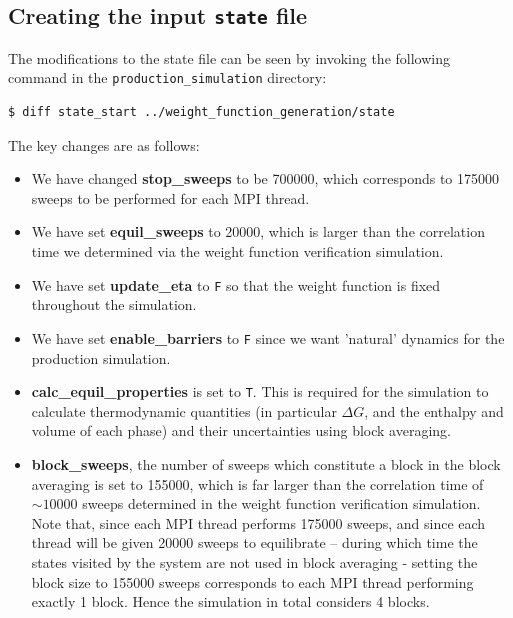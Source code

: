 \documentclass{report}
\begin{document}
\subsection{Creating the input \texttt{state} file}
The modifications to the state file can be seen by invoking the following command in the \texttt{production\_simulation} directory:
\begin{verbatim}
$ diff state_start ../weight_function_generation/state
\end{verbatim}
The key changes are as follows:
\begin{itemize}
\item We have changed \textbf{stop\_sweeps} to be 700000, which corresponds to 175000 sweeps to be performed for each MPI thread.
\item We have set \textbf{equil\_sweeps} to 20000, which is larger than the correlation time we determined via the weight function verification
simulation.
\item We have set \textbf{update\_eta} to \texttt{F} so that the weight function is fixed throughout the simulation.
\item We have set \textbf{enable\_barriers} to \texttt{F} since we want 'natural' dynamics for the production simulation.
\item \textbf{calc\_equil\_properties} is set to \texttt{T}. This is required for the simulation to calculate thermodynamic quantities (in particular
$\Delta G$, and the enthalpy and volume of each phase) and their uncertainties using block averaging.
\item \textbf{block\_sweeps}, the number of sweeps which constitute a block in the block averaging is set to 155000, which is far larger than the 
correlation time of $\sim 10000$ sweeps determined in the weight function verification simulation. Note that, since each MPI thread performs 
175000 sweeps, and since each thread will be given 20000 sweeps to equilibrate -- during which time the states visited by the system are not 
used in block averaging - setting the block size to 155000 sweeps corresponds to each MPI thread performing exactly 1 block. Hence the 
simulation in total considers 4 blocks.
\end{itemize}
\end{document}
